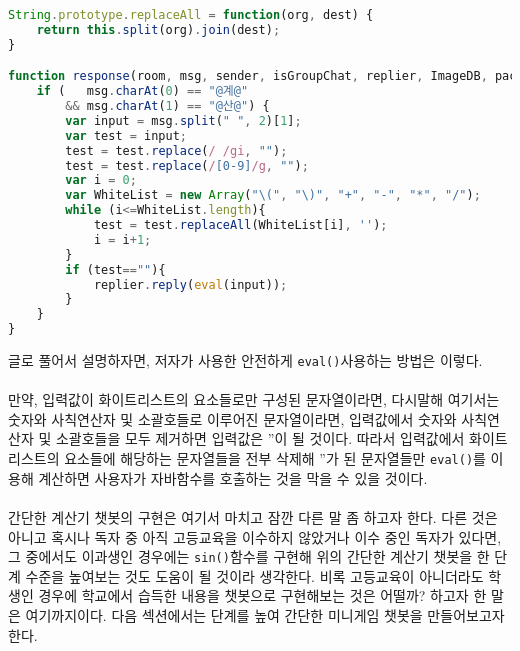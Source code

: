 \documentclass[10pt,b6paper,final]{book}
\begin{document}
\begin{lstlisting}[language=JavaScript,escapeinside=@@]
String.prototype.replaceAll = function(org, dest) {
    return this.split(org).join(dest);
}

function response(room, msg, sender, isGroupChat, replier, ImageDB, packageName, threadId) {
    if (   msg.charAt(0) == "@계@" 
        && msg.charAt(1) == "@산@") {
        var input = msg.split(" ", 2)[1];
        var test = input;
        test = test.replace(/ /gi, "");
        test = test.replace(/[0-9]/g, "");
        var i = 0;
        var WhiteList = new Array("\(", "\)", "+", "-", "*", "/");
        while (i<=WhiteList.length){
            test = test.replaceAll(WhiteList[i], '');
            i = i+1;
        }
        if (test==""){
            replier.reply(eval(input));
        }
    }
}
\end{lstlisting}
글로 풀어서 설명하자면, 저자가 사용한 안전하게 \texttt{eval()}사용하는 방법은 이렇다.\\
\\
만약, 입력값이 화이트리스트의 요소들로만 구성된 문자열이라면,
다시말해 여기서는 숫자와 사칙연산자 및 소괄호들로 이루어진 문자열이라면,
입력값에서 숫자와 사칙연산자 및 소괄호들을 모두 제거하면 입력값은 ''이 될 것이다. 따라서
입력값에서 화이트리스트의 요소들에 해당하는 문자열들을 전부 삭제해 ''가 된 문자열들만
\texttt{eval()}를 이용해 계산하면 사용자가 자바함수를 호출하는 것을 막을 수 있을 것이다.\\
\\
간단한 계산기 챗봇의 구현은 여기서 마치고 잠깐 다른 말 좀 하고자 한다.
다른 것은 아니고 혹시나 독자 중 아직 고등교육을 이수하지 않았거나 이수 중인 독자가 있다면,
그 중에서도 이과생인 경우에는 \texttt{sin()}함수를 구현해 위의 간단한 계산기 챗봇을 한 단계
수준을 높여보는 것도 도움이 될 것이라 생각한다. 비록 고등교육이 아니더라도 학생인 경우에
학교에서 습득한 내용을 챗봇으로 구현해보는 것은 어떨까?
하고자 한 말은 여기까지이다. 다음 섹션에서는 단계를 높여 간단한 미니게임 챗봇을 만들어보고자 한다.
\end{document}
